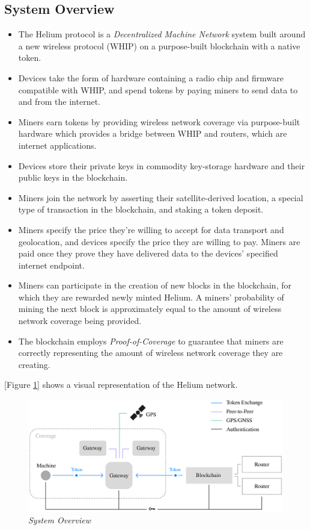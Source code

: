 \documentclass[10pt, nonatbib, nocopyrightspace, reprint]{sigplanconf}
\begin{document}
\subsection{System Overview}

\begin{itemize}
    \item The Helium protocol is a \emph{Decentralized Machine Network} system built around a new wireless protocol (WHIP) on a purpose-built blockchain with a native token.
    \item Devices take the form of hardware containing a radio chip and firmware compatible with WHIP, and spend tokens by paying miners to send data to and from the internet.
    \item Miners earn tokens by providing wireless network coverage via purpose-built hardware which provides a bridge between WHIP and routers, which are internet applications.
    \item Devices store their private keys in commodity key-storage hardware and their public keys in the blockchain.
    \item Miners join the network by asserting their satellite-derived location, a special type of transaction in the blockchain, and staking a token deposit.
    \item Miners specify the price they're willing to accept for data transport and geolocation, and devices specify the price they are willing to pay. Miners are paid once they prove they have delivered data to the devices' specified internet endpoint.
    \item Miners can participate in the creation of new blocks in the blockchain, for which they are rewarded newly minted Helium. A miners' probability of mining the next block is approximately equal to the amount of wireless network coverage being provided.
    \item The blockchain employs \emph{Proof-of-Coverage} to guarantee that miners are correctly representing the amount of wireless network coverage they are creating.
\end{itemize}

[Figure \ref{fig:system}] shows a visual representation of the Helium network.

\begin{figure}[ht]
    \begin{center}
          \includegraphics[width=\textwidth]{schematic.eps}
          \caption{\emph{System Overview}}
          \label{fig:system}
     \end{center}
\end{figure}
\end{document}
